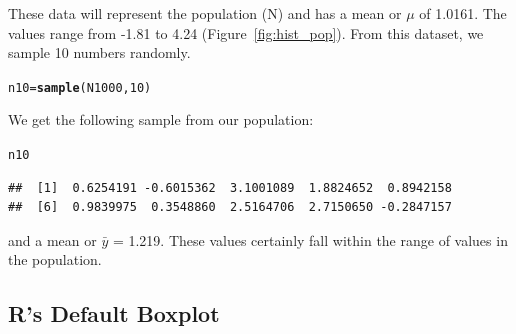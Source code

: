 \documentclass{tufte-handout}\usepackage[]{graphicx}\usepackage[]{color}
\makeatletter
\newcommand{\hlnum}[1]{\textcolor[rgb]{0.686,0.059,0.569}{#1}}%
\newcommand{\hlstd}[1]{\textcolor[rgb]{0.345,0.345,0.345}{#1}}%
\newcommand{\hlkwb}[1]{\textcolor[rgb]{0.69,0.353,0.396}{#1}}%
\newcommand{\hlkwd}[1]{\textcolor[rgb]{0.737,0.353,0.396}{\textbf{#1}}}%
\newenvironment{kframe}{%
 \def\at@end@of@kframe{}%
 \ifinner\ifhmode%
  \def\at@end@of@kframe{\end{minipage}}%
  \begin{minipage}{\columnwidth}%
 \fi\fi%
 \def\FrameCommand##1{\hskip\@totalleftmargin \hskip-\fboxsep
 \colorbox{shadecolor}{##1}\hskip-\fboxsep
     \hskip-\linewidth \hskip-\@totalleftmargin \hskip\columnwidth}%
 \MakeFramed {\advance\hsize-\width
   \@totalleftmargin\z@ \linewidth\hsize
   \@setminipage}}%
 {\par\unskip\endMakeFramed%
 \at@end@of@kframe}
\newenvironment{knitrout}{}{} %
\makeatother
\begin{document}
These data will represent the population (N) and has a mean or $\mu$ of 1.0161. The values range from -1.81 to 4.24 (Figure~\ref{fig:hist_pop}). From this dataset, we sample 10 numbers randomly. 

\begin{knitrout}
\color{fgcolor}\begin{kframe}
\begin{alltt}
\hlstd{n10} \hlkwb{=} \hlkwd{sample}\hlstd{(N1000,} \hlnum{10}\hlstd{)}
\end{alltt}
\end{kframe}
\end{knitrout}

We get the following sample from our population: 
\begin{knitrout}
\color{fgcolor}\begin{kframe}
\begin{alltt}
\hlstd{n10}
\end{alltt}
\begin{verbatim}
##  [1]  0.6254191 -0.6015362  3.1001089  1.8824652  0.8942158
##  [6]  0.9839975  0.3548860  2.5164706  2.7150650 -0.2847157
\end{verbatim}
\end{kframe}
\end{knitrout}
\noindent and a mean or $\bar{y}$ = 1.219. These values certainly fall within the range of values in the population.

\subsection{R's Default Boxplot}
\end{document}
